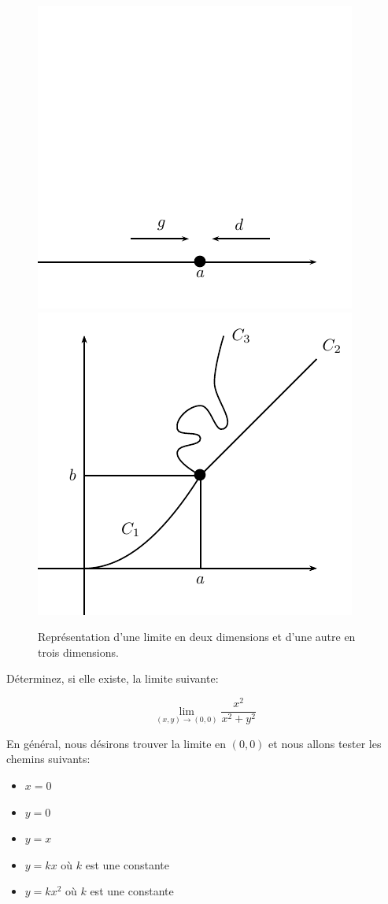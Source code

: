 \documentclass[]{book}
\providecommand{\tightlist}{%
  \setlength{\itemsep}{0pt}\setlength{\parskip}{0pt}}
\theoremstyle{definition}
\theoremstyle{definition}
\theoremstyle{definition}
\theoremstyle{remark}
\let\BeginKnitrBlock\begin \let\EndKnitrBlock\end
\begin{document}
\begin{figure}

{\centering \includegraphics[width=0.45\linewidth]{resources/images/latex/limite2d} \includegraphics[width=0.45\linewidth]{resources/images/latex/limite3d} 

}

\caption{Représentation d'une limite en deux dimensions et d'une autre en trois dimensions.}\label{fig:limites2d-3d}
\end{figure}

\BeginKnitrBlock{example}
\protect\hypertarget{exm:unnamed-chunk-137}{}{\label{exm:unnamed-chunk-137}
}Déterminez, si elle existe, la limite suivante:

\[ \lim_{(x,y)\to (0,0)}\dfrac{x^2}{x^2+y^2} \]
\EndKnitrBlock{example}

En général, nous désirons trouver la limite en \((0,0)\) et nous allons
tester les chemins suivants:

\begin{itemize}
\tightlist
\item
  \(x=0\)
\item
  \(y=0\)
\item
  \(y=x\)
\item
  \(y=kx\) où \(k\) est une constante
\item
  \(y=kx^2\) où \(k\) est une constante
\end{itemize}
\end{document}
